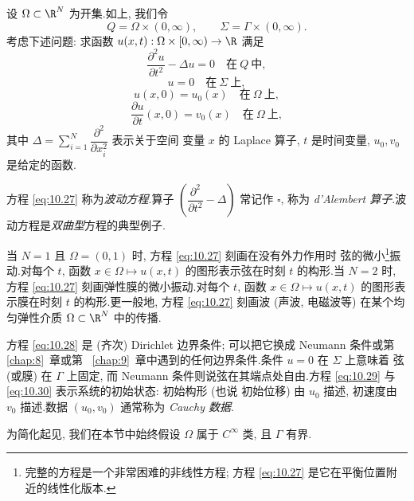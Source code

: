设 $\Omega\subset\R^N$ 为开集.如上, 我们令
\begin{equation*}
Q=\Omega\times(0,\infty),\qquad\Sigma=\Gamma\times(0,\infty).
\end{equation*}
考虑下述问题: 求函数 $u(x,t):\Omega\times[0,\infty)\to\R$ 满足
\begin{equation}
\frac{\partial^2u}{\partial t^2}-\Delta u=0\quad\text{在}\ Q\ \text{中},
\label{eq:10.27}
\end{equation}
\begin{equation}
u=0\quad\text{在}\ \Sigma\ \text{上},
\label{eq:10.28}
\end{equation}
\begin{equation}
u(x,0)=u_0(x)\quad\text{在}\ \Omega\ \text{上},
\label{eq:10.29}
\end{equation}
\begin{equation}
\frac{\partial u}{\partial t}(x,0)=v_0(x)\quad\text{在}\ \Omega\ \text{上},
\label{eq:10.30}
\end{equation}
其中 $\Delta=\sum_{i=1}^N\dfrac{\partial^2}{\partial x_i^2}$ 表示关于空间
变量 $x$ 的 Laplace 算子, $t$ 是时间变量, $u_0,v_0$ 是给定的函数.

方程 \eqref{eq:10.27} 称为\emph{波动方程}.算子
$\left(\dfrac{\partial^2}{\partial t^2}-\Delta\right)$ 常记作 $\square$,
称为 \emph{d'Alembert 算子}.波动方程是\emph{双曲型}方程的典型例子.

当 $N=1$ 且 $\Omega=(0,1)$ 时, 方程 \eqref{eq:10.27} 刻画在没有外力作用时
弦的微小\footnote{完整的方程是一个非常困难的非线性方程; 方程
\eqref{eq:10.27} 是它在平衡位置附近的线性化版本.}振动.对每个 $t$, 函数
$x\in\Omega\mapsto u(x,t)$ 的图形表示弦在时刻 $t$ 的构形.当 $N=2$ 时,
方程 \eqref{eq:10.27} 刻画弹性膜的微小振动.对每个 $t$, 函数
$x\in\Omega\mapsto u(x,t)$ 的图形表示膜在时刻 $t$ 的构形.更一般地, 方程
\eqref{eq:10.27} 刻画波 (声波, 电磁波等) 在某个均匀弹性介质
$\Omega\subset\R^N$ 中的传播.

方程 \eqref{eq:10.28} 是 (齐次) Dirichlet 边界条件; 可以把它换成 Neumann
条件或第~
\ref{chap:8}~章或第~
\ref{chap:9}~章中遇到的任何边界条件.条件 $u=0$ 在 $\Sigma$ 上意味着
弦 (或膜) 在 $\Gamma$ 上固定, 而 Neumann 条件则说弦在其端点处自由.方程
\eqref{eq:10.29} 与 \eqref{eq:10.30} 表示系统的初始状态: 初始构形 (也说
初始位移) 由 $u_0$ 描述, 初速度由 $v_0$ 描述.数据 $(u_0,v_0)$ 通常称为
\emph{Cauchy 数据}.

为简化起见, 我们在本节中始终假设 $\Omega$ 属于 $C^\infty$ 类, 且 $\Gamma$
有界.

